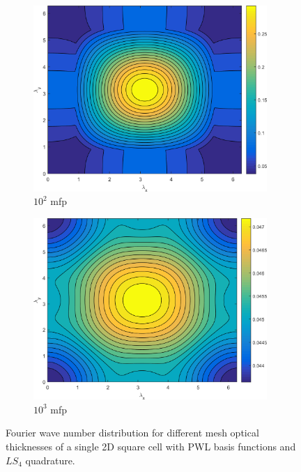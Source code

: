 \begin{figure}
{\begin{subfigure}[b]{0.485\textwidth}
		\centering
		\includegraphics[width=0.975\textwidth]{figures/appendices/SI_M4S_UPWLD1_LS4_x=100_dydx=1_contour.png}
		\caption{$10^{2}$ mfp}
	\end{subfigure}
	\hfill
	\begin{subfigure}[b]{0.485\textwidth}
		\centering
		\includegraphics[width=0.975\textwidth]{figures/appendices/SI_M4S_UPWLD1_LS4_x=1000_dydx=1_contour.png}
		\caption{$10^{3}$ mfp}
	\end{subfigure}
	}
\caption{Fourier wave number distribution for different mesh optical thicknesses of a single 2D square cell with PWL basis functions and $LS_{4}$ quadrature.}
\label{fig::App_DSA_M4S_LS4}
\end{figure}

